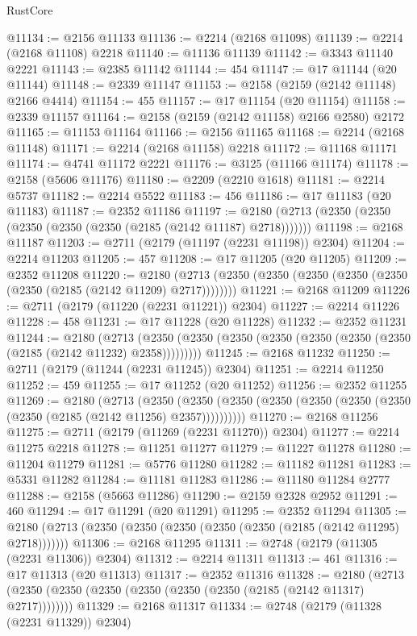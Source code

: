 \begin{lexlean}{RustCore}
\begin{coremodule}
@11134 := @2156 @11133
@11136 := @2214 (@2168 @11098)
@11139 := @2214 (@2168 @11108) @2218
@11140 := @11136 @11139
@11142 := @3343 @11140 @2221
@11143 := @2385 @11142
@11144 := 454
@11147 := @17 @11144 (@20 @11144)
@11148 := @2339 @11147
@11153 := @2158 (@2159 (@2142 @11148) @2166 @4414)
@11154 := 455
@11157 := @17 @11154 (@20 @11154)
@11158 := @2339 @11157
@11164 := @2158 (@2159 (@2142 @11158) @2166 @2580) @2172
@11165 := @11153 @11164
@11166 := @2156 @11165
@11168 := @2214 (@2168 @11148)
@11171 := @2214 (@2168 @11158) @2218
@11172 := @11168 @11171
@11174 := @4741 @11172 @2221
@11176 := @3125 (@11166 @11174)
@11178 := @2158 (@5606 @11176)
@11180 := @2209 (@2210 @1618)
@11181 := @2214 @5737
@11182 := @2214 @5522
@11183 := 456
@11186 := @17 @11183 (@20 @11183)
@11187 := @2352 @11186
@11197 := @2180 (@2713 (@2350 (@2350 (@2350 (@2350 (@2350 (@2185 (@2142 @11187) @2718)))))))
@11198 := @2168 @11187
@11203 := @2711 (@2179 (@11197 (@2231 @11198)) @2304)
@11204 := @2214 @11203
@11205 := 457
@11208 := @17 @11205 (@20 @11205)
@11209 := @2352 @11208
@11220 := @2180 (@2713 (@2350 (@2350 (@2350 (@2350 (@2350 (@2350 (@2185 (@2142 @11209) @2717))))))))
@11221 := @2168 @11209
@11226 := @2711 (@2179 (@11220 (@2231 @11221)) @2304)
@11227 := @2214 @11226
@11228 := 458
@11231 := @17 @11228 (@20 @11228)
@11232 := @2352 @11231
@11244 := @2180
    (@2713 (@2350 (@2350 (@2350 (@2350 (@2350 (@2350 (@2350 (@2185 (@2142 @11232) @2358)))))))))
@11245 := @2168 @11232
@11250 := @2711 (@2179 (@11244 (@2231 @11245)) @2304)
@11251 := @2214 @11250
@11252 := 459
@11255 := @17 @11252 (@20 @11252)
@11256 := @2352 @11255
@11269 := @2180
    (@2713
      (@2350 (@2350 (@2350 (@2350 (@2350 (@2350 (@2350 (@2350 (@2185 (@2142 @11256) @2357))))))))))
@11270 := @2168 @11256
@11275 := @2711 (@2179 (@11269 (@2231 @11270)) @2304)
@11277 := @2214 @11275 @2218
@11278 := @11251 @11277
@11279 := @11227 @11278
@11280 := @11204 @11279
@11281 := @5776 @11280
@11282 := @11182 @11281
@11283 := @5331 @11282
@11284 := @11181 @11283
@11286 := @11180 @11284 @2777
@11288 := @2158 (@5663 @11286)
@11290 := @2159 @2328 @2952
@11291 := 460
@11294 := @17 @11291 (@20 @11291)
@11295 := @2352 @11294
@11305 := @2180 (@2713 (@2350 (@2350 (@2350 (@2350 (@2350 (@2185 (@2142 @11295) @2718)))))))
@11306 := @2168 @11295
@11311 := @2748 (@2179 (@11305 (@2231 @11306)) @2304)
@11312 := @2214 @11311
@11313 := 461
@11316 := @17 @11313 (@20 @11313)
@11317 := @2352 @11316
@11328 := @2180 (@2713 (@2350 (@2350 (@2350 (@2350 (@2350 (@2350 (@2185 (@2142 @11317) @2717))))))))
@11329 := @2168 @11317
@11334 := @2748 (@2179 (@11328 (@2231 @11329)) @2304)

\end{coremodule}
\end{lexlean}

